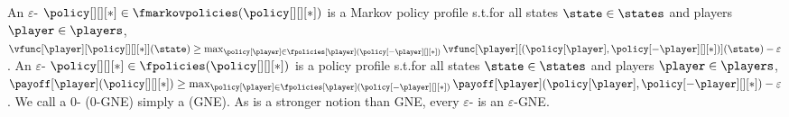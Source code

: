 An $\varepsilon$- $\policy[][][*] \in \fmarkovpolicies (\policy[][][*])$ is a Markov policy profile s.t.\@ for all states $\state \in \states$ and players $\player \in \players$, $\vfunc[\player][{\policy[][][*]}] (\state) \geq \max_{\policy[\player] \in \fpolicies[\player] (\policy[-\player][][*])} \vfunc[\player][{(\policy[\player], \policy[-\player][][*])}] (\state) - \varepsilon$.  
An $\varepsilon$- $\policy[][][*] \in \fpolicies (\policy[][][*])$ is a policy profile s.t.\@ for all states $\state \in \states$ and players $\player \in \players$, $\payoff[\player] ({\policy[][][*]}) \geq \max_{\policy[\player] \in \fpolicies[\player] (\policy[-\player][][*])} \payoff[\player] (\policy[\player], \policy[-\player][][*]) - \varepsilon$. 
We call a $0$-\MPGNE{} ($0$-GNE) simply a \MPGNE{} (GNE).
As \MPGNE{} is a stronger notion than GNE, every $\varepsilon$-\MPGNE{} is an $\varepsilon$-GNE.


